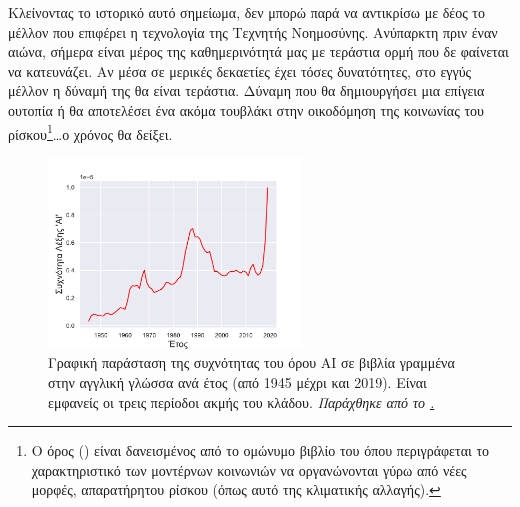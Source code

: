 Κλείνοντας το ιστορικό αυτό σημείωμα, δεν μπορώ παρά να αντικρίσω με δέος το μέλλον που επιφέρει η τεχνολογία της Τεχνητής Νοημοσύνης. Ανύπαρκτη πριν έναν αιώνα, σήμερα είναι μέρος της καθημερινότητά μας με τεράστια ορμή που δε φαίνεται να κατευνάζει. Αν μέσα σε μερικές δεκαετίες έχει τόσες δυνατότητες, στο εγγύς μέλλον η δύναμή της θα είναι τεράστια. Δύναμη που θα δημιουργήσει μια επίγεια ουτοπία ή θα αποτελέσει ένα ακόμα τουβλάκι στην οικοδόμηση της κοινωνίας του ρίσκου\footnote{Ο όρος  () είναι δανεισμένος από το ομώνυμο βιβλίο του  \cite{beck2014risk} όπου περιγράφεται το χαρακτηριστικό των μοντέρνων κοινωνιών να οργανώνονται γύρω από νέες μορφές, απαρατήρητου ρίσκου (όπως αυτό της κλιματικής αλλαγής).}\dots ο χρόνος θα δείξει.


\begin{figure}[h]
    \centering
    \includegraphics[width=0.6\textwidth]{images/introduction/ngramAI_greek.pdf}
    \caption{Γραφική παράσταση της συχνότητας του όρου AI σε βιβλία γραμμένα στην αγγλική γλώσσα ανά έτος (από 1945 μέχρι και 2019). Είναι εμφανείς οι τρεις περίοδοι ακμής του κλάδου. \textit{Παράχθηκε από το \href{https://books.google.com/ngrams}{.}} }
\end{figure}


